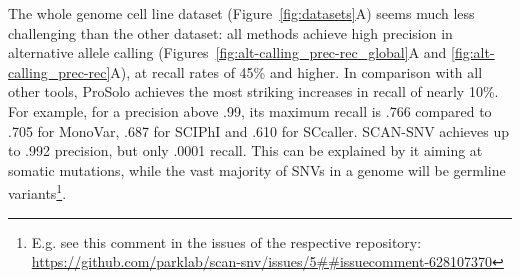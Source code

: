 \documentclass[authoryear,preprint,11pt]{scrartcl}
\begin{document}
The whole genome cell line dataset (Figure~\ref{fig:datasets}A) seems much less challenging than the other dataset: all methods achieve high precision in alternative allele calling (Figures~\ref{fig:alt-calling_prec-rec_global}A and \ref{fig:alt-calling_prec-rec}A), at recall rates of 45\% and higher. 
In comparison with all other tools, ProSolo achieves the most striking increases in recall of nearly 10\%.
For example, for a precision above .99, its maximum recall is .766 compared to .705 for MonoVar, .687 for SCIPhI and .610 for SCcaller.
SCAN-SNV achieves up to .992 precision, but only .0001 recall.
This can be explained by it aiming at somatic mutations, while the vast majority of SNVs in a genome will be germline variants\footnote{E.g. see this comment in the issues of the respective repository: \url{https://github.com/parklab/scan-snv/issues/5##issuecomment-628107370}}.
\end{document}
